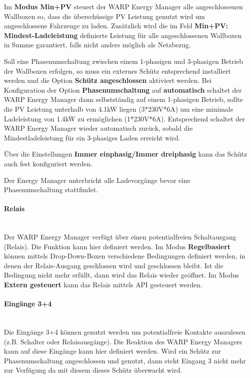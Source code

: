 \documentclass[a4paper,10pt]{article}
\begin{document}
\begin{multicols*}{2}
	Im \textbf{Modus \glqq Min+PV\grqq}
	steuert der WARP Energy Manager alle angeschlossenen Wallboxen so, dass die
	überschüssige PV Leistung genutzt wird um angeschlossene Fahrzeuge zu laden.
	Zusätzlich wird die im Feld \textbf{\glqq Min+PV:
	Mindest-Ladeleistung\grqq} definierte Leistung für alle angeschlossenen
	Wallboxen in Summe garantiert, falls nicht anders möglich als Netzbezug.

	Soll eine Phasenumschaltung zwischen einem 1-phasigen und 3-phasigen Betrieb
	der Wallboxen erfolgen, so muss ein externes Schütz entsprechend installiert
	werden und die Option \textbf{Schütz angeschlossen} aktiviert werden. Bei
	Konfiguration der Option \textbf{Phasenumschaltung} auf \textbf{automatisch}
	schaltet der WARP Energy Manager dann selbstständig auf einem 1-phasigen
	Betrieb, sollte die PV Leistung unterhalb von 4.1kW liegen (3*230V*6A) um
	eine minimale Ladeleistung von 1.4kW zu ermöglichen (1*230V*6A).
	Entsprechend schaltet der WARP Energy Manager wieder automatisch zurück,
	sobald die Mindestladeleistung für ein 3-phasiges Laden erreicht wird.

	Über die Einstellungen \textbf{Immer einphasig/Immer dreiphasig} kann das
	Schütz auch fest konfiguriert werden.

	Der Energy Manager unterbricht alle Ladevorgänge bevor eine
	Phasenumschaltung stattfindet.

	\paragraph{Relais}\ \\
	Der WARP Energy Manager verfügt über einen potentialfreien Schaltausgang
	(Relais). Die Funktion kann hier definiert werden. Im Modus
	\textbf{Regelbasiert} können mittels Drop-Down-Boxen verschiedene Bedingungen definiert werden, in
	denen der Relais-Ausgang geschlossen wird und geschlossen bleibt. Ist die
	Bedingung nicht mehr erfüllt, dann wird das Relais wieder geöffnet.
	Im Modus \textbf{Extern gesteuert} kann das Relais mittels API gesteuert
	werden.
	\paragraph{Eingänge 3+4}\ \\
	Die Eingänge 3+4 können genutzt werden um potentialfreie Kontakte auszulesen
	(z.B. Schalter oder Relaisausgänge). Die Reaktion des WARP Energy Managers
	kann auf diese Eingänge kann hier definiert werden. Wird ein Schütz zur
	Phasenumschaltung angeschlossen und genutzt, dann steht Eingang 3 nicht mehr
	zur Verfügung da mit diesem dieses Schütz überwacht wird.


\end{multicols*}
\end{document}
